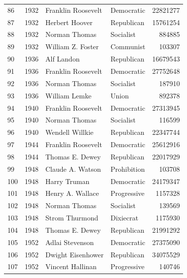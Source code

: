 \documentclass[
  letterpaper,
  DIV=11,
  numbers=noendperiod]{scrreprt}
\begin{document}
\begin{tabular}{lrllr}
86  &  1932 &      Franklin Roosevelt &             Democratic &      22821277 \\
87  &  1932 &          Herbert Hoover &             Republican &      15761254 \\
88  &  1932 &           Norman Thomas &              Socialist &        884885 \\
89  &  1932 &       William Z. Foster &              Communist &        103307 \\
90  &  1936 &              Alf Landon &             Republican &      16679543 \\
91  &  1936 &      Franklin Roosevelt &             Democratic &      27752648 \\
92  &  1936 &           Norman Thomas &              Socialist &        187910 \\
93  &  1936 &           William Lemke &                  Union &        892378 \\
94  &  1940 &      Franklin Roosevelt &             Democratic &      27313945 \\
95  &  1940 &           Norman Thomas &              Socialist &        116599 \\
96  &  1940 &         Wendell Willkie &             Republican &      22347744 \\
97  &  1944 &      Franklin Roosevelt &             Democratic &      25612916 \\
98  &  1944 &         Thomas E. Dewey &             Republican &      22017929 \\
99  &  1948 &        Claude A. Watson &            Prohibition &        103708 \\
100 &  1948 &            Harry Truman &             Democratic &      24179347 \\
101 &  1948 &        Henry A. Wallace &            Progressive &       1157328 \\
102 &  1948 &           Norman Thomas &              Socialist &        139569 \\
103 &  1948 &          Strom Thurmond &              Dixiecrat &       1175930 \\
104 &  1948 &         Thomas E. Dewey &             Republican &      21991292 \\
105 &  1952 &         Adlai Stevenson &             Democratic &      27375090 \\
106 &  1952 &       Dwight Eisenhower &             Republican &      34075529 \\
107 &  1952 &        Vincent Hallinan &            Progressive &        140746 \\

\end{tabular}
\end{document}
